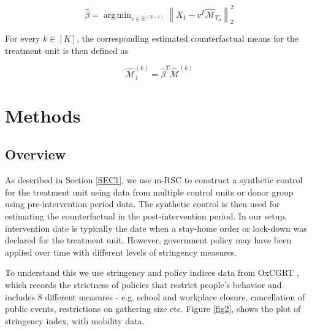 \documentclass[preprint,authoryear,12pt]{elsarticle}
\DeclareMathOperator*{\argmin}{arg\,min}
\begin{document}
	\begin{equation*}
	\hat{\beta} = \argmin_{v \in \mathbb{R}^{(N-1)} } \left\| X_1 - v^T \hat{\mathcal{M}}_{T_0}\right\|^2_2
	\end{equation*}
	
	For every $k \in [K]$, the corresponding estimated counterfactual means for the treatment unit is then defined as
	
	\begin{equation*}
	\hat{\mathcal{M}}_1^{(k)} = \hat{\beta}^T \hat{\mathcal{M}}^{(k)}
	\end{equation*}
	
\section{Methods}
	\label{SEC3}
	\subsection{Overview}
	As described in Section \ref{SEC1}, we use m-RSC to construct a synthetic control for the treatment unit using data from multiple control units or donor group using pre-intervention period data.  The synthetic control is then used for estimating the counterfactual in the post-intervention period. In our setup, intervention date is typically the date when a stay-home order or lock-down was declared for the treatment unit.  However, government policy may have been applied over time with different levels of stringency measures. 
	
	To understand this we use stringency and policy indices data from OxCGRT \cite{HWP2020}, which records the strictness of policies that restrict people’s behavior and includes 8 different measures - e.g. school  and workplace closure, cancellation of public events, restrictions on gathering size etc. Figure \ref{fig2}, shows the plot of stringency index, with mobility data. 
\end{document}
